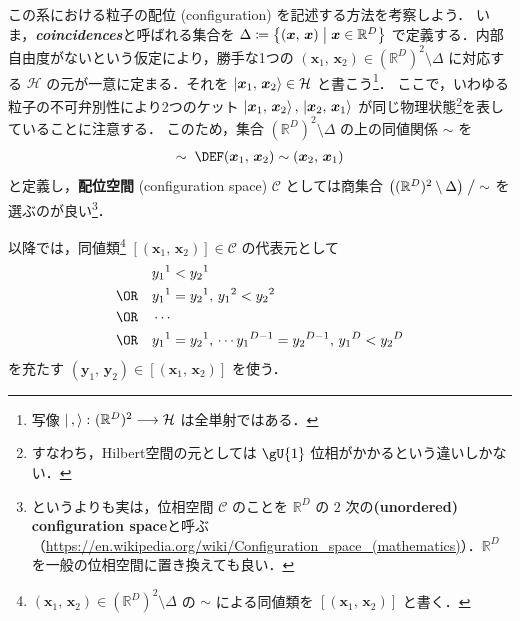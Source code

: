 \documentclass[TQFT_main]{subfiles}
\begin{document}
この系における粒子の配位 (configuration) を記述する方法を考察しよう．
いま，\textit{\textbf{coincidences}}と呼ばれる集合を
$\Delta \coloneqq \bigl\{ (\bm{x},\, \bm{x}) \bigm| \bm{x} \in \mathbb{R}^D\bigr\}$
で定義する．内部自由度がないという仮定により，勝手な1つの $(\bm{x}_1,\, \bm{x}_2) \in (\mathbb{R}^D)^2 \setminus \Delta$ に対応する $\mathcal{H}$ の元が一意に定まる．それを $\ket{\bm{x}_1,\, \bm{x}_2} \in \mathcal{H}$ と書こう\footnote{写像 $\ket{\,,\, } \colon (\mathbb{R}^D)^2 \longrightarrow \mathcal{H}$ は全単射ではある．}．
ここで，いわゆる粒子の不可弁別性により2つのケット $\ket{\bm{x}_1,\, \bm{x}_2},\, \ket{\bm{x}_2,\, \bm{x}_1}$ が同じ物理状態\footnote{すなわち，Hilbert空間の元としては $\gU{1}$ 位相がかかるという違いしかない．}を表していることに注意する．
このため，集合 $(\mathbb{R}^D)^2 \setminus \Delta$ の上の同値関係 $\sim$ を
\begin{align}
    \sim\; \DEF (\bm{x}_1,\, \bm{x}_2) \sim (\bm{x}_2,\, \bm{x}_1)
\end{align}
と定義し，\textbf{配位空間} (configuration space) $\mathcal{C}$ としては商集合 $\bigl((\mathbb{R}^D)^2 \setminus \Delta\bigr) \bigm/ {\sim}$ を選ぶのが良い\footnote{というよりも実は，位相空間 $\mathcal{C}$ のことを $\mathbb{R}^D$ の $2$ 次の\textbf{(unordered) configuration space}と呼ぶ（\url{https://en.wikipedia.org/wiki/Configuration_space_(mathematics)}）．$\mathbb{R}^D$ を一般の位相空間に置き換えても良い．}．

\begin{marker}
    以降では，同値類\footnote{$(\bm{x}_1,\, \bm{x}_2) \in (\mathbb{R}^D)^2 \setminus \Delta$ の $\sim$ による同値類を $[(\bm{x}_1,\, \bm{x}_2)]$ と書く．} $[(\bm{x}_1,\, \bm{x}_2)] \in \mathcal{C}$ の代表元として
    \begin{align}
        &y_1{}^1 < y_2{}^1 \\ 
        \OR \quad&y_1{}^1 = y_2{}^1,\, y_1{}^2 < y_2{}^2 \\
        \OR \quad&\cdots \\
        \OR \quad&y_1{}^1 = y_2{}^1,\, \cdots y_1{}^{D-1} = y_2{}^{D-1},\, y_1{}^D < y_2{}^D
    \end{align}
    を充たす $(\bm{y}_1,\, \bm{y}_2) \in [(\bm{x}_1,\, \bm{x}_2)]$ を使う．
\end{marker}

\end{document}

